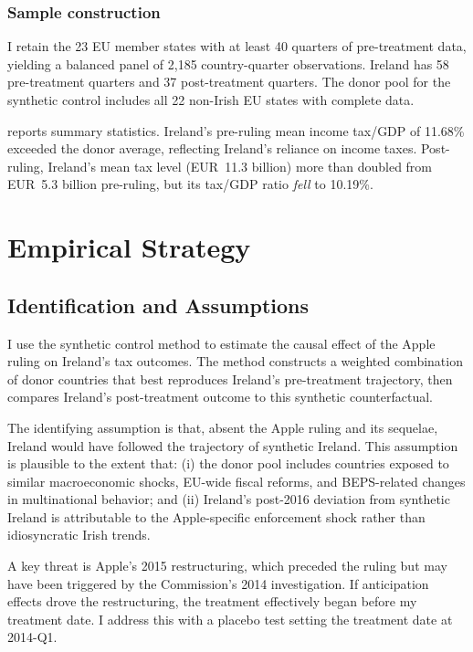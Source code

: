 \documentclass[12pt]{article}
\begin{document}
\subsubsection*{Sample construction} I retain the 23 EU member states with at least 40 quarters of pre-treatment data, yielding a balanced panel of 2,185 country-quarter observations. Ireland has 58 pre-treatment quarters and 37 post-treatment quarters. The donor pool for the synthetic control includes all 22 non-Irish EU states with complete data.



 reports summary statistics. Ireland's pre-ruling mean income tax/GDP of 11.68\% exceeded the donor average, reflecting Ireland's reliance on income taxes. Post-ruling, Ireland's mean tax level (EUR~11.3 billion) more than doubled from EUR~5.3 billion pre-ruling, but its tax/GDP ratio \textit{fell} to 10.19\%.

\section{Empirical Strategy}

\subsection{Identification and Assumptions}

I use the synthetic control method \citep{abadie2010synthetic, abadie2015comparative} to estimate the causal effect of the Apple ruling on Ireland's tax outcomes. The method constructs a weighted combination of donor countries that best reproduces Ireland's pre-treatment trajectory, then compares Ireland's post-treatment outcome to this synthetic counterfactual.

The identifying assumption is that, absent the Apple ruling and its sequelae, Ireland would have followed the trajectory of synthetic Ireland. This assumption is plausible to the extent that: (i) the donor pool includes countries exposed to similar macroeconomic shocks, EU-wide fiscal reforms, and BEPS-related changes in multinational behavior; and (ii) Ireland's post-2016 deviation from synthetic Ireland is attributable to the Apple-specific enforcement shock rather than idiosyncratic Irish trends.

A key threat is Apple's 2015 restructuring, which preceded the ruling but may have been triggered by the Commission's 2014 investigation. If anticipation effects drove the restructuring, the treatment effectively began before my treatment date. I address this with a placebo test setting the treatment date at 2014-Q1.
\end{document}
